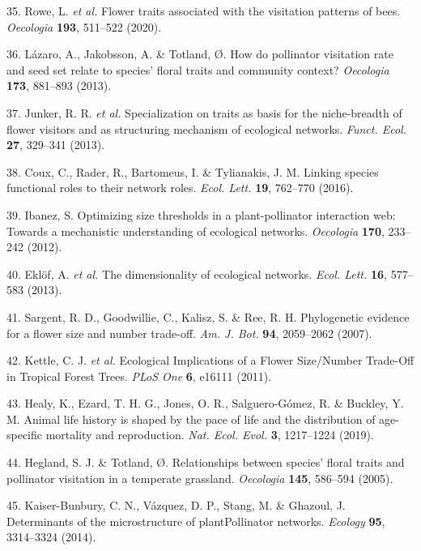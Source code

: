 \documentclass[12pt,a4paper,]{article}
\begin{document}
\hypertarget{ref-rowe2020}{}
35. Rowe, L. \emph{et al.} Flower traits associated with the visitation
patterns of bees. \emph{Oecologia} \textbf{193}, 511--522 (2020).

\hypertarget{ref-lazaro2013}{}
36. Lázaro, A., Jakobsson, A. \& Totland, Ø. How do pollinator
visitation rate and seed set relate to species' floral traits and
community context? \emph{Oecologia} \textbf{173}, 881--893 (2013).

\hypertarget{ref-junker2013}{}
37. Junker, R. R. \emph{et al.} Specialization on traits as basis for
the niche-breadth of flower visitors and as structuring mechanism of
ecological networks. \emph{Funct. Ecol.} \textbf{27}, 329--341 (2013).

\hypertarget{ref-coux2016}{}
38. Coux, C., Rader, R., Bartomeus, I. \& Tylianakis, J. M. Linking
species functional roles to their network roles. \emph{Ecol. Lett.}
\textbf{19}, 762--770 (2016).

\hypertarget{ref-ibanez2012}{}
39. Ibanez, S. Optimizing size thresholds in a plant-pollinator
interaction web: Towards a mechanistic understanding of ecological
networks. \emph{Oecologia} \textbf{170}, 233--242 (2012).

\hypertarget{ref-eklof2013}{}
40. Eklöf, A. \emph{et al.} The dimensionality of ecological networks.
\emph{Ecol. Lett.} \textbf{16}, 577--583 (2013).

\hypertarget{ref-sargent2007}{}
41. Sargent, R. D., Goodwillie, C., Kalisz, S. \& Ree, R. H.
Phylogenetic evidence for a flower size and number trade-off. \emph{Am.
J. Bot.} \textbf{94}, 2059--2062 (2007).

\hypertarget{ref-kettle2011}{}
42. Kettle, C. J. \emph{et al.} Ecological Implications of a Flower
Size/Number Trade-Off in Tropical Forest Trees. \emph{PLoS One}
\textbf{6}, e16111 (2011).

\hypertarget{ref-healy2019}{}
43. Healy, K., Ezard, T. H. G., Jones, O. R., Salguero-Gómez, R. \&
Buckley, Y. M. Animal life history is shaped by the pace of life and the
distribution of age-specific mortality and reproduction. \emph{Nat.
Ecol. Evol.} \textbf{3}, 1217--1224 (2019).

\hypertarget{ref-hegland2005}{}
44. Hegland, S. J. \& Totland, Ø. Relationships between species' floral
traits and pollinator visitation in a temperate grassland.
\emph{Oecologia} \textbf{145}, 586--594 (2005).

\hypertarget{ref-kaiser2014}{}
45. Kaiser-Bunbury, C. N., Vázquez, D. P., Stang, M. \& Ghazoul, J.
Determinants of the microstructure of plantPollinator networks.
\emph{Ecology} \textbf{95}, 3314--3324 (2014).
\end{document}
